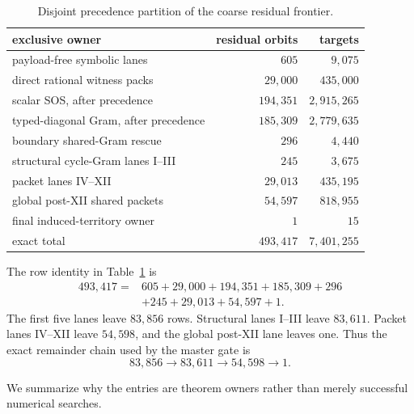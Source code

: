 \documentclass[11pt]{article}
\theoremstyle{remark}
\begin{document}
\begin{table}[ht]
\centering
\small
\begin{tabular}{lrr}
\toprule
exclusive owner & residual orbits & targets\\
\midrule
payload-free symbolic lanes & $605$ & $9{,}075$\\
direct rational witness packs & $29{,}000$ & $435{,}000$\\
scalar SOS, after precedence & $194{,}351$ & $2{,}915{,}265$\\
typed-diagonal Gram, after precedence & $185{,}309$ & $2{,}779{,}635$\\
boundary shared-Gram rescue & $296$ & $4{,}440$\\
structural cycle-Gram lanes I--III & $245$ & $3{,}675$\\
packet lanes IV--XII & $29{,}013$ & $435{,}195$\\
global post-XII shared packets & $54{,}597$ & $818{,}955$\\
final induced-territory owner & $1$ & $15$\\
\midrule
exact total & $493{,}417$ & $7{,}401{,}255$\\
\bottomrule
\end{tabular}
\caption{Disjoint precedence partition of the coarse residual frontier.}
\label{tab:owners}
\end{table}

The row identity in Table~\ref{tab:owners} is
\begin{equation}\tag{7}
\begin{split}
493{,}417={}&605+29{,}000+194{,}351+185{,}309+296\\
            &+245+29{,}013+54{,}597+1.
\end{split}
\end{equation}
The first five lanes leave $83{,}856$ rows.  Structural lanes I--III leave
$83{,}611$.  Packet lanes IV--XII leave $54{,}598$, and the global post-XII
lane leaves one.  Thus the exact remainder chain used by the master gate is
\[
 83{,}856\longrightarrow83{,}611\longrightarrow54{,}598
 \longrightarrow1.                                         \tag{8}
\]

We summarize why the entries are theorem owners rather than merely successful
numerical searches.
\end{document}
